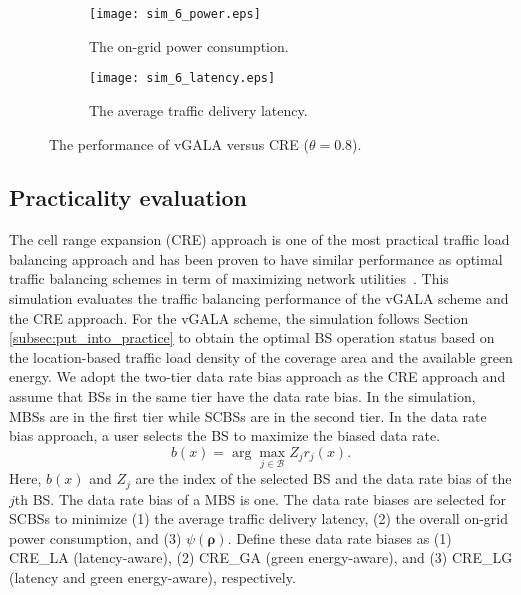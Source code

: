 \documentclass[journal]{IEEEtran}
\theoremstyle{definition}
\begin{document}
\begin{figure*}
\centering
\hspace*{\fill}
    \begin{subfigure}[b]{0.5\textwidth}
            \texttt{[image: sim\_6\_power.eps]}
            \caption{The on-grid power consumption.}
            \label{fig:sim_6_power}
    \end{subfigure}\begin{subfigure}[b]{0.5\textwidth}
            \texttt{[image: sim\_6\_latency.eps]}
            \caption{The average traffic delivery latency.}
            \label{fig:sim_6_latency}
   \end{subfigure}\hfill
       \caption{The performance of vGALA versus CRE ($\theta=0.8$).
     }\label{fig:sim_6_power_latency}
\vspace{-16pt}
\end{figure*}

\subsection{Practicality evaluation}
The cell range expansion (CRE) approach is one of the most practical traffic load balancing approach and has been proven to have similar performance as optimal traffic balancing schemes in term of maximizing network utilities~\cite{Andrews:2014:AOLB,Ye:2013:UAL}.
This simulation evaluates the traffic balancing performance of the vGALA scheme and the CRE approach.
For the vGALA scheme, the simulation follows Section \ref{subsec:put_into_practice} to obtain the optimal BS operation status based on the location-based traffic load density of the coverage area and the available green energy. We adopt the two-tier data rate bias approach as the CRE approach and assume that BSs in the same tier have the data rate bias. In the simulation, MBSs are in the first tier while SCBSs are in the second tier. In the data rate bias approach, a user selects the BS to maximize the biased data rate.
\begin{equation}
\label{eq:cre_alg}
b(x)=\arg\max_{j\in\mathcal{B}} Z_{j}r_{j}(x).
\end{equation}
Here, $b(x)$ and $Z_{j}$ are the index of the selected BS and the data rate bias of the $j$th BS. The data rate bias of a MBS is one. The data rate biases are selected for SCBSs to minimize (1) the average traffic delivery latency, (2) the overall on-grid power consumption, and (3) $\psi(\boldsymbol{\rho})$. Define these data rate biases as (1) CRE\_LA (latency-aware), (2) CRE\_GA (green energy-aware), and (3) CRE\_LG (latency and green energy-aware), respectively.
\end{document}
